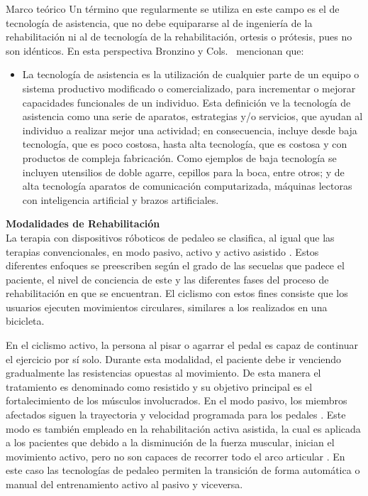 \begin{thesischapter}{1} {Marco teórico}
    \vspace{10pt}
    Un término que regularmente se utiliza en este campo es el de tecnología de asistencia, que no debe equipararse al de ingeniería de la rehabilitación ni al de tecnología de la rehabilitación, ortesis o prótesis, pues no son idénticos. En esta perspectiva Bronzino y Cols.~\cite{enderle2012introduction} mencionan que:

    \begin{itemize}
        \item La tecnología de asistencia es la utilización de cualquier parte de un equipo o sistema productivo modificado o comercializado, para incrementar o mejorar capacidades funcionales de un individuo. Esta definición ve la tecnología de asistencia como una serie de aparatos, estrategias y/o servicios, que ayudan al individuo a realizar mejor una actividad; en consecuencia, incluye desde baja tecnología, que es poco costosa, hasta alta tecnología, que es costosa y con productos de compleja fabricación. Como ejemplos de baja tecnología se incluyen utensilios de doble agarre, cepillos para la boca, entre otros; y de alta tecnología aparatos de comunicación computarizada, máquinas lectoras con inteligencia artificial y brazos artificiales.
    \end{itemize}
    
    \vspace{10pt}
    \textbf{Modalidades de Rehabilitación} \\ 
    La terapia con dispositivos róboticos de pedaleo se clasifica, al igual que las terapias convencionales, en modo pasivo, activo y activo asistido \cite{barclay2019effect}. Estos diferentes enfoques se preescriben según el grado de las secuelas que padece el paciente, el nivel de conciencia de este y las diferentes fases del proceso de rehabilitación en que se encuentran. El ciclismo con estos fines consiste que los usuarios ejecuten movimientos circulares, similares a los realizados en una bicicleta.

    \vspace{5pt}
    En el ciclismo activo, la persona al pisar o agarrar el pedal es capaz de continuar el ejercicio por sí solo. Durante esta modalidad, el paciente debe ir venciendo gradualmente las resistencias opuestas al movimiento. De esta manera el tratamiento es denominado como resistido y su objetivo principal es el fortalecimiento de los músculos involucrados. En el modo pasivo, los miembros afectados siguen la trayectoria y velocidad programada para los pedales \cite{ferreira2020virtual}. Este modo es también empleado en la rehabilitación activa asistida, la cual es aplicada a los pacientes que debido a la disminución de la fuerza muscular, inician el movimiento activo, pero no son capaces de recorrer todo el arco articular \cite{cruz2009guia}. En este caso las tecnologías de pedaleo permiten la transición de forma automática o manual del entrenamiento activo al pasivo y viceversa.


\end{thesischapter}
